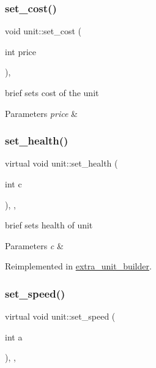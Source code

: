 \mbox{\label{classunit_a1f7b84a24ff09c2653e5c6d2d046472e}} 
\subsubsection{\texorpdfstring{set\+\_\+cost()}{set\_cost()}}
{\footnotesize\ttfamily void unit\+::set\+\_\+cost (\begin{DoxyParamCaption}\item[{int}]{price }\end{DoxyParamCaption})\hspace{0.3cm}{\ttfamily [inline]}, {\ttfamily [protected]}}

brief sets cost of the unit 
\begin{DoxyParams}{Parameters}
{\em price} & \\
\hline
\end{DoxyParams}
\mbox{\label{classunit_a1dabc406074919750b1c606496e8e42d}} 
\subsubsection{\texorpdfstring{set\+\_\+health()}{set\_health()}}
{\footnotesize\ttfamily virtual void unit\+::set\+\_\+health (\begin{DoxyParamCaption}\item[{int}]{c }\end{DoxyParamCaption})\hspace{0.3cm}{\ttfamily [inline]}, {\ttfamily [protected]}, {\ttfamily [virtual]}}

brief sets health of unit 
\begin{DoxyParams}{Parameters}
{\em c} & \\
\hline
\end{DoxyParams}


Reimplemented in \mbox{\hyperlink{classextra__unit__builder_a7471f05c65d3f2c230c405ec0bcdaa7d}{extra\+\_\+unit\+\_\+builder}}.

\mbox{\label{classunit_a3b2dbfe9c1daaf2b8ef6b604d7803dc2}} 
\subsubsection{\texorpdfstring{set\+\_\+speed()}{set\_speed()}}
{\footnotesize\ttfamily virtual void unit\+::set\+\_\+speed (\begin{DoxyParamCaption}\item[{int}]{a }\end{DoxyParamCaption})\hspace{0.3cm}{\ttfamily [inline]}, {\ttfamily [protected]}, {\ttfamily [virtual]}}


